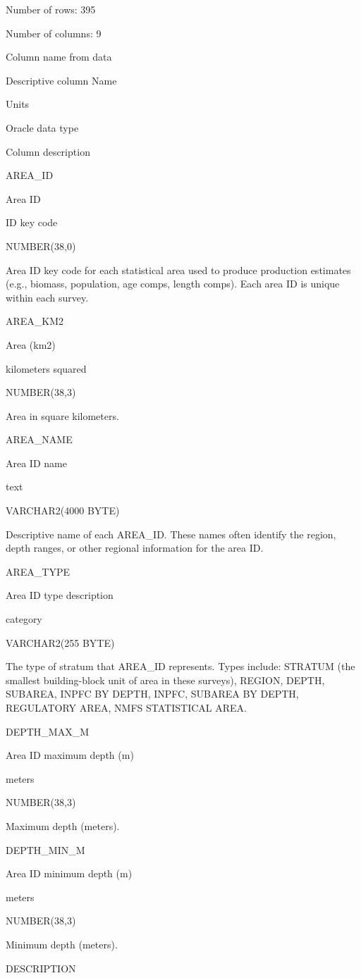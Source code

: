 \documentclass[
  letterpaper,
  oneside,
  open=any]{scrbook}
\begin{document}
Number of rows: 395

Number of columns: 9

Column name from data

Descriptive column Name

Units

Oracle data type

Column description

AREA\_ID

Area ID

ID key code

NUMBER(38,0)

Area ID key code for each statistical area used to produce production
estimates (e.g., biomass, population, age comps, length comps). Each
area ID is unique within each survey.

AREA\_KM2

Area (km2)

kilometers squared

NUMBER(38,3)

Area in square kilometers.

AREA\_NAME

Area ID name

text

VARCHAR2(4000 BYTE)

Descriptive name of each AREA\_ID. These names often identify the
region, depth ranges, or other regional information for the area ID.

AREA\_TYPE

Area ID type description

category

VARCHAR2(255 BYTE)

The type of stratum that AREA\_ID represents. Types include: STRATUM
(the smallest building-block unit of area in these surveys), REGION,
DEPTH, SUBAREA, INPFC BY DEPTH, INPFC, SUBAREA BY DEPTH, REGULATORY
AREA, NMFS STATISTICAL AREA.

DEPTH\_MAX\_M

Area ID maximum depth (m)

meters

NUMBER(38,3)

Maximum depth (meters).

DEPTH\_MIN\_M

Area ID minimum depth (m)

meters

NUMBER(38,3)

Minimum depth (meters).

DESCRIPTION
\end{document}
